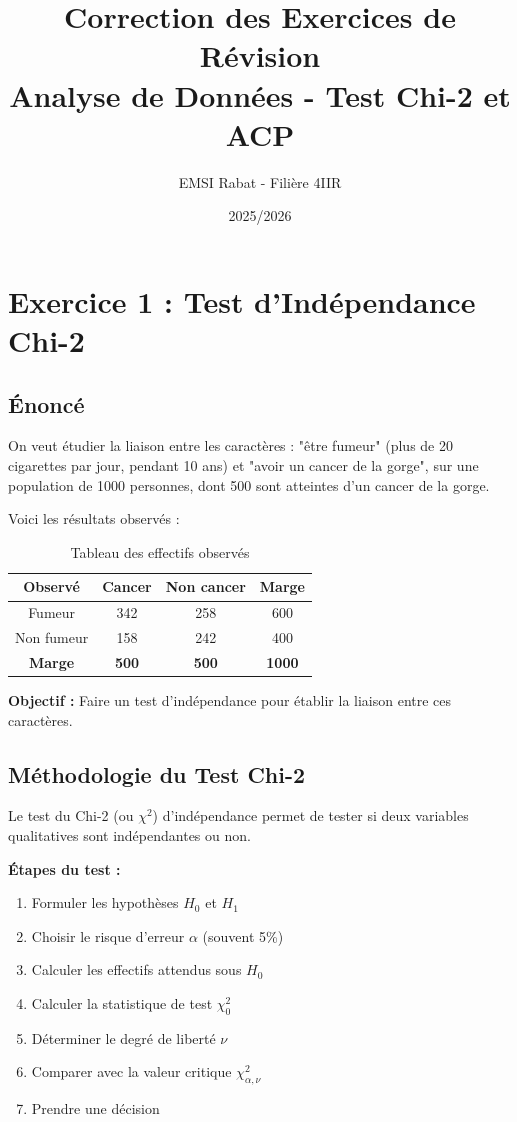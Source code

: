 \documentclass[11pt,a4paper]{article}
\title{Correction des Exercices de Révision\\
\large Analyse de Données - Test Chi-2 et ACP}
\author{EMSI Rabat - Filière 4IIR}
\date{2025/2026}
\begin{document}
\maketitle

\tableofcontents
\newpage

\section{Exercice 1 : Test d'Indépendance Chi-2}

\subsection{Énoncé}

On veut étudier la liaison entre les caractères : "être fumeur" (plus de 20 cigarettes par jour, pendant 10 ans) et "avoir un cancer de la gorge", sur une population de 1000 personnes, dont 500 sont atteintes d'un cancer de la gorge. 

Voici les résultats observés :

\begin{table}[h]
\centering
\begin{tabular}{|c|c|c|c|}
\hline
\textbf{Observé} & \textbf{Cancer} & \textbf{Non cancer} & \textbf{Marge} \\
\hline
Fumeur & 342 & 258 & 600 \\
\hline
Non fumeur & 158 & 242 & 400 \\
\hline
\textbf{Marge} & \textbf{500} & \textbf{500} & \textbf{1000} \\
\hline
\end{tabular}
\caption{Tableau des effectifs observés}
\end{table}

\textbf{Objectif :} Faire un test d'indépendance pour établir la liaison entre ces caractères.

\subsection{Méthodologie du Test Chi-2}

\begin{definitionbox}
Le test du Chi-2 (ou $\chi^2$) d'indépendance permet de tester si deux variables qualitatives sont indépendantes ou non.

\textbf{Étapes du test :}
\begin{enumerate}
    \item Formuler les hypothèses $H_0$ et $H_1$
    \item Choisir le risque d'erreur $\alpha$ (souvent 5\%)
    \item Calculer les effectifs attendus sous $H_0$
    \item Calculer la statistique de test $\chi_0^2$
    \item Déterminer le degré de liberté $\nu$
    \item Comparer avec la valeur critique $\chi_{\alpha,\nu}^2$
    \item Prendre une décision
\end{enumerate}
\end{definitionbox}
\end{document}
